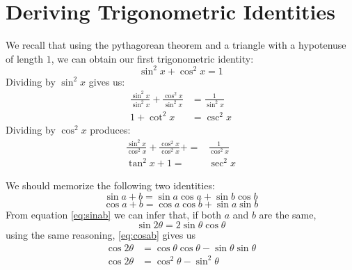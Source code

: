 \section{Deriving Trigonometric Identities}\label{sec:trigderiv}

We recall that using the pythagorean theorem and a triangle with a hypotenuse of length $1$, we can obtain our first trigonometric identity:
\begin{equation}
	\sin^2x+\cos^2x=1
  \label{eq:pyth}
\end{equation}
Dividing by $\sin^2x$ gives us:
\begin{align}
\frac{\sin^2x}{\sin^2x}+\frac{\cos^2x}{\sin^2x}&=\frac{1}{\sin^2x} \nonumber \\
	1+\cot^2x&=\csc^2x
\end{align}
Dividing by $\cos^2x$ produces:
\begin{align}
  \frac{\sin^2x}{\cos^2x}+\frac{\cos^2x}{\cos^2x}+=&\frac{1}{\cos^2x} \nonumber \\
	\tan^2x+1=&\sec^2x
\end{align}

We should memorize the following two identities:
\begin{equation}
  \sin{a+b}=\sin a \cos a + \sin b \cos b
  \label{eq:sinab}
\end{equation}
\begin{equation}
  \cos{a+b}=\cos a \cos b + \sin a \sin b
  \label{eq:cosab}
\end{equation}
From equation \eqref{eq:sinab} we can infer that, if both $a$ and $b$ are the same,
\begin{equation}
  \sin{2\theta}=2 \sin \theta \cos \theta
  \label{eq:sin2q}
\end{equation}
using the same reasoning, \eqref{eq:cosab} gives us
\begin{align}
  \cos{2\theta}&=\cos \theta \cos \theta- \sin\theta \sin\theta \nonumber\\
  \cos{2\theta}&=\cos^2 \theta - \sin^2\theta
  \label{eq:cos2q}
\end{align}

